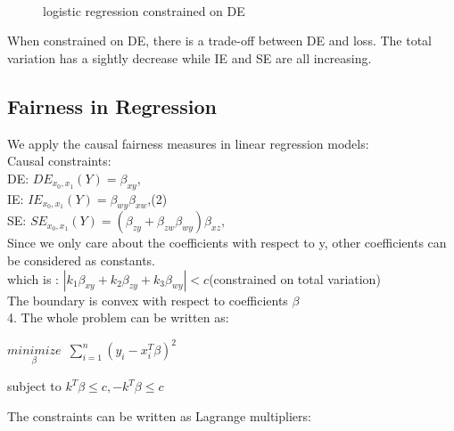 \documentclass{article} %
\begin{document}
\\
\FloatBarrier
\begin{figure}[!htb]
    \centering
    \qquad
    \hspace*{-3em}
    \caption{logistic regression constrained on DE}%
\end{figure}
\FloatBarrier
\hspace*{1em}When constrained on DE, there is a trade-off between DE and loss. The total variation has a sightly decrease while IE and SE are all increasing.

\subsection{Fairness in Regression}
\hspace*{1em}We apply the causal fairness measures in linear regression models:\\
\hspace*{1em}Causal constraints: \\
\hspace*{5em}DE:  $DE_{x_0,x_1}(Y) = \beta_{xy}$,\\
\hspace*{5em}IE: $IE_{x_0,x_1}(Y) = \beta_{wy}\beta_{xw}$,\hfill(2)\\
\hspace*{5em}SE: $SE_{x_0,x_1}(Y) = (\beta_{zy}+\beta_{zw}\beta_{wy})\beta_{xz}$,\\
\hspace*{1em}Since we only care about the coefficients with respect to y, other coefficients can be considered as constants.\\
\hspace*{1em}which is : $|k_1\beta_{xy}+k_2\beta_{zy}+k_3\beta_{wy}|<c$(constrained on total variation)\\
\hspace*{1em}The boundary is convex with respect to coefficients $\beta$\\
\hspace*{1em}4. The whole problem can be written as:\\
\centerline{$\underset{\beta}{minimize}\,\,\,\sum_{i=1}^{n}(y_i-x_i^T\beta)^2$}
\centerline{subject to $k^T\beta\leq c, -k^T\beta\leq c$}
\hspace*{1em}The constraints can be written as Lagrange multipliers:\\
\end{document}
